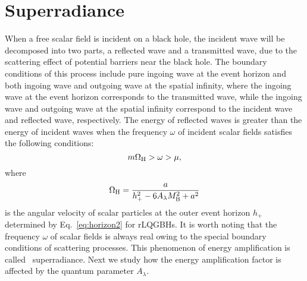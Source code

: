 \documentclass[12pt]{article}
\begin{document}
 \section{Superradiance}\label{sec:superradiance}
When a free scalar field is incident on a black hole, the incident wave will be decomposed into two parts, a reflected wave and a transmitted wave, due to the scattering effect of potential barriers near the black hole.
The boundary conditions of this process include pure ingoing wave at the event horizon and both ingoing wave and outgoing wave at the spatial infinity, where the ingoing wave at the event horizon  corresponds to the transmitted wave, while the ingoing wave and outgoing wave at the spatial infinity correspond to the incident wave and reflected wave, respectively.
The energy of reflected waves is greater than the energy of incident waves when the frequency $\omega$ of incident scalar fields satisfies~\cite{Yang:2022yvq} the following conditions:
\begin{equation}
     m\Omega_{\rm H}>\omega>\mu, \label{instability}
\end{equation}
where 
\begin{equation}\label{eq:angular-vec}
    \Omega_{\rm H}=\frac{a}{h_+^2-6A_\lambda M_{\rm B}^2+a^2}
\end{equation}
is the angular velocity of scalar particles at the outer event horizon $h_+$ determined by Eq.~\eqref{eq:horizon2} for rLQGBHs.
It is worth noting that the frequency $\omega$ of scalar fields is always real owing to the special boundary conditions of scattering processes.
This phenomenon of energy amplification is called~\cite{Brito:2015oca} superradiance.
Next we study how the energy amplification factor is affected by the quantum parameter $A_\lambda$.
 
    
    
    
    
\end{document}
